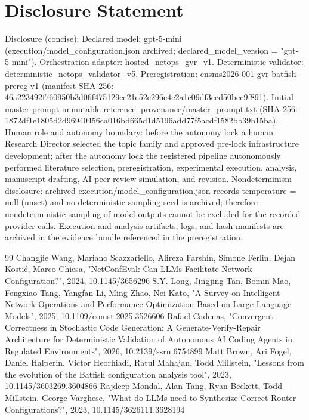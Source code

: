 \documentclass[conference]{IEEEtran}
\begin{document}
\section*{Disclosure Statement}
Disclosure (concise): Declared model: gpt-5-mini (execution/model\_configuration.json archived; declared\_model\_version = "gpt-5-mini"). Orchestration adapter: hosted\_netops\_gvr\_v1. Deterministic validator: deterministic\_netops\_validator\_v5. Preregistration: cnsms2026-001-gvr-batfish-prereg-v1 (manifest SHA‑256: 46a22349\allowbreak{}2f760950\allowbreak{}b3d06f47\allowbreak{}5129ce21\allowbreak{}e52e296c\allowbreak{}4c2a1e09\allowbreak{}df3ccd50\allowbreak{}bec9f891). Initial master prompt immutable reference: provenance/master\_prompt.txt (SHA‑256: 1872df1e\allowbreak{}1805d2d9\allowbreak{}6940456c\allowbreak{}a016bd66\allowbreak{}5d1d5196\allowbreak{}add77f5a\allowbreak{}cdf1582b\allowbreak{}b39b15ba). Human role and autonomy boundary: before the autonomy lock a human Research Director selected the topic family and approved pre‑lock infrastructure development; after the autonomy lock the registered pipeline autonomously performed literature selection, preregistration, experimental execution, analysis, manuscript drafting, AI peer review simulation, and revision. Nondeterminism disclosure: archived execution/model\_configuration.json records temperature = null (unset) and no deterministic sampling seed is archived; therefore nondeterministic sampling of model outputs cannot be excluded for the recorded provider calls. Execution and analysis artifacts, logs, and hash manifests are archived in the evidence bundle referenced in the preregistration.

\begin{thebibliography}{99}
 Changjie Wang, Mariano Scazzariello, Alireza Farshin, Simone Ferlin, Dejan Kostić, Marco Chiesa, "NetConfEval: Can LLMs Facilitate Network Configuration?", 2024, 10.1145/3656296
 S.Y. Long, Jingjing Tan, Bomin Mao, Fengxiao Tang, Yangfan Li, Ming Zhao, Nei Kato, "A Survey on Intelligent Network Operations and Performance Optimization Based on Large Language Models", 2025, 10.1109/comst.2025.3526606
 Rafael Cadenas, "Convergent Correctness in Stochastic Code Generation: A Generate-Verify-Repair Architecture for Deterministic Validation of Autonomous AI Coding Agents in Regulated Environments", 2026, 10.2139/ssrn.6754899
 Matt Brown, Ari Fogel, Daniel Halperin, Victor Heorhiadi, Ratul Mahajan, Todd Millstein, "Lessons from the evolution of the Batfish configuration analysis tool", 2023, 10.1145/3603269.3604866
 Rajdeep Mondal, Alan Tang, Ryan Beckett, Todd Millstein, George Varghese, "What do LLMs need to Synthesize Correct Router Configurations?", 2023, 10.1145/3626111.3628194
\end{thebibliography}
\end{document}
